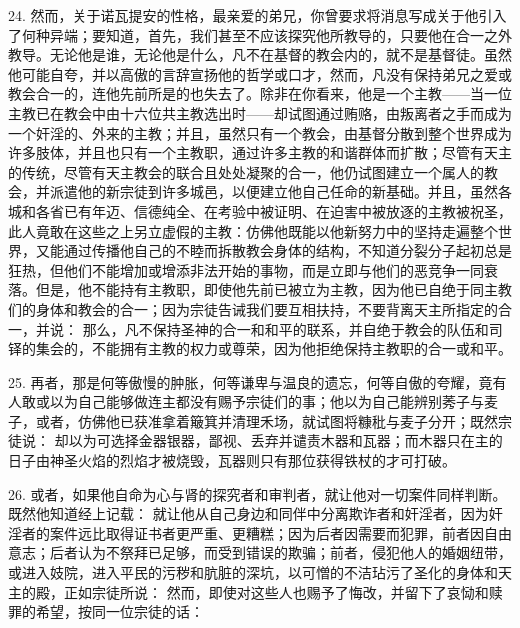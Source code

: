 24. 然而，关于诺瓦提安的性格，最亲爱的弟兄，你曾要求将消息写成关于他引入了何种异端；要知道，首先，我们甚至不应该探究他所教导的，只要他在合一之外教导。无论他是谁，无论他是什么，凡不在基督的教会内的，就不是基督徒。虽然他可能自夸，并以高傲的言辞宣扬他的哲学或口才，然而，凡没有保持弟兄之爱或教会合一的，连他先前所是的也失去了。除非在你看来，他是一个主教——当一位主教已在教会中由十六位共主教选出时——却试图通过贿赂，由叛离者之手而成为一个奸淫的、外来的主教；并且，虽然只有一个教会，由基督分散到整个世界成为许多肢体，并且也只有一个主教职，通过许多主教的和谐群体而扩散；尽管有天主的传统，尽管有天主教会的联合且处处凝聚的合一，他仍试图建立一个属人的教会，并派遣他的新宗徒到许多城邑，以便建立他自己任命的新基础。并且，虽然各城和各省已有年迈、信德纯全、在考验中被证明、在迫害中被放逐的主教被祝圣，此人竟敢在这些之上另立虚假的主教：仿佛他既能以他新努力中的坚持走遍整个世界，又能通过传播他自己的不睦而拆散教会身体的结构，不知道分裂分子起初总是狂热，但他们不能增加或增添非法开始的事物，而是立即与他们的恶竞争一同衰落。但是，他不能持有主教职，即使他先前已被立为主教，因为他已自绝于同主教们的身体和教会的合一；因为宗徒告诫我们要互相扶持，不要背离天主所指定的合一，并说： 那么，凡不保持圣神的合一和和平的联系，并自绝于教会的队伍和司铎的集会的，不能拥有主教的权力或尊荣，因为他拒绝保持主教职的合一或和平。\par

25. 再者，那是何等傲慢的肿胀，何等谦卑与温良的遗忘，何等自傲的夸耀，竟有人敢或以为自己能够做连主都没有赐予宗徒们的事；他以为自己能辨别莠子与麦子，或者，仿佛他已获准拿着簸箕并清理禾场，就试图将糠秕与麦子分开；既然宗徒说： 却以为可选择金器银器，鄙视、丢弃并谴责木器和瓦器；而木器只在主的日子由神圣火焰的烈焰才被烧毁，瓦器则只有那位获得铁杖的才可打破。\par

26. 或者，如果他自命为心与肾的探究者和审判者，就让他对一切案件同样判断。既然他知道经上记载： 就让他从自己身边和同伴中分离欺诈者和奸淫者，因为奸淫者的案件远比取得证书者更严重、更糟糕；因为后者因需要而犯罪，前者因自由意志；后者认为不祭拜已足够，而受到错误的欺骗；前者，侵犯他人的婚姻纽带，或进入妓院，进入平民的污秽和肮脏的深坑，以可憎的不洁玷污了圣化的身体和天主的殿，正如宗徒所说： 然而，即使对这些人也赐予了悔改，并留下了哀恸和赎罪的希望，按同一位宗徒的话：\par

